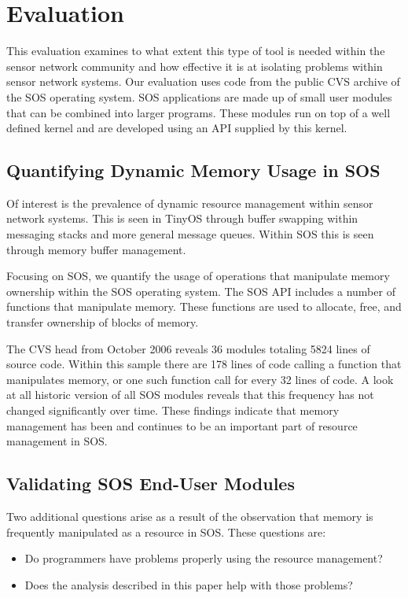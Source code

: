 \section{Evaluation}
\label{sec:eval}

This evaluation examines to what extent this type of tool is needed
within the sensor network community and how effective it is at
isolating problems within sensor network systems.  Our evaluation
uses code from the public CVS archive of the SOS operating system.
SOS applications are made up of small
user modules that can be combined into larger programs.  These modules
run on top of a well defined kernel and are developed using an API
supplied by this kernel.


\subsection{Quantifying Dynamic Memory Usage in SOS}

Of interest is the prevalence of dynamic resource management within
sensor network systems.  This is seen in TinyOS through buffer swapping
within messaging stacks and more general message queues.  Within SOS
this is seen through memory buffer management.  

Focusing on SOS, we quantify the usage of operations that manipulate
memory ownership within the SOS operating system.  The SOS API
includes a number of functions that manipulate memory.  These
functions are used to allocate, free, and transfer ownership of blocks
of memory.  

The CVS head from October 2006 reveals 36 modules totaling 5824 lines
of source code.  Within this sample there are 178 lines of code
calling a function that manipulates memory, or one such function call
for every 32 lines of code.  A look at all historic version of all
SOS modules reveals that this frequency has not changed significantly
over time.  These findings indicate that memory management has been
and continues to be an important part of resource management in SOS.


\subsection{Validating SOS End-User Modules}

Two additional questions arise as a result of the observation that
memory is frequently manipulated as a resource in SOS.  These
questions are:
%
\begin{itemize}
%
\item Do programmers have problems properly using the resource
management?
%
\item Does the analysis described in this paper help with
those problems?
%
\end{itemize}

